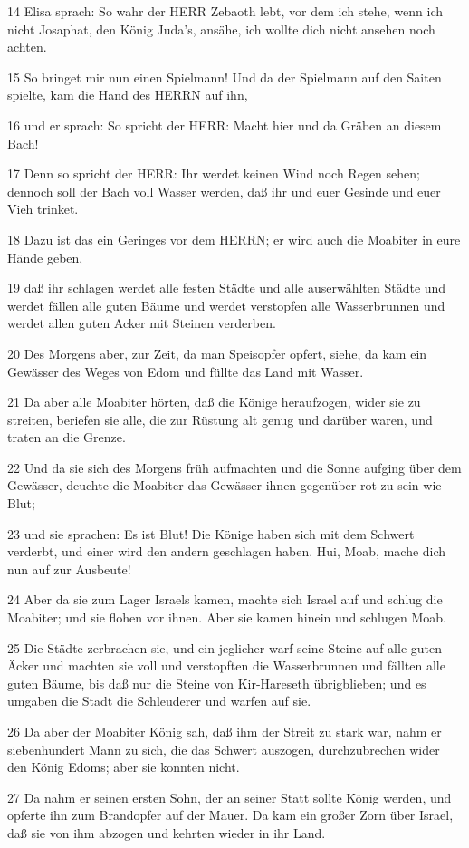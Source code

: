 \par 14 Elisa sprach: So wahr der HERR Zebaoth lebt, vor dem ich stehe, wenn ich nicht Josaphat, den König Juda's, ansähe, ich wollte dich nicht ansehen noch achten.
\par 15 So bringet mir nun einen Spielmann! Und da der Spielmann auf den Saiten spielte, kam die Hand des HERRN auf ihn,
\par 16 und er sprach: So spricht der HERR: Macht hier und da Gräben an diesem Bach!
\par 17 Denn so spricht der HERR: Ihr werdet keinen Wind noch Regen sehen; dennoch soll der Bach voll Wasser werden, daß ihr und euer Gesinde und euer Vieh trinket.
\par 18 Dazu ist das ein Geringes vor dem HERRN; er wird auch die Moabiter in eure Hände geben,
\par 19 daß ihr schlagen werdet alle festen Städte und alle auserwählten Städte und werdet fällen alle guten Bäume und werdet verstopfen alle Wasserbrunnen und werdet allen guten Acker mit Steinen verderben.
\par 20 Des Morgens aber, zur Zeit, da man Speisopfer opfert, siehe, da kam ein Gewässer des Weges von Edom und füllte das Land mit Wasser.
\par 21 Da aber alle Moabiter hörten, daß die Könige heraufzogen, wider sie zu streiten, beriefen sie alle, die zur Rüstung alt genug und darüber waren, und traten an die Grenze.
\par 22 Und da sie sich des Morgens früh aufmachten und die Sonne aufging über dem Gewässer, deuchte die Moabiter das Gewässer ihnen gegenüber rot zu sein wie Blut;
\par 23 und sie sprachen: Es ist Blut! Die Könige haben sich mit dem Schwert verderbt, und einer wird den andern geschlagen haben. Hui, Moab, mache dich nun auf zur Ausbeute!
\par 24 Aber da sie zum Lager Israels kamen, machte sich Israel auf und schlug die Moabiter; und sie flohen vor ihnen. Aber sie kamen hinein und schlugen Moab.
\par 25 Die Städte zerbrachen sie, und ein jeglicher warf seine Steine auf alle guten Äcker und machten sie voll und verstopften die Wasserbrunnen und fällten alle guten Bäume, bis daß nur die Steine von Kir-Hareseth übrigblieben; und es umgaben die Stadt die Schleuderer und warfen auf sie.
\par 26 Da aber der Moabiter König sah, daß ihm der Streit zu stark war, nahm er siebenhundert Mann zu sich, die das Schwert auszogen, durchzubrechen wider den König Edoms; aber sie konnten nicht.
\par 27 Da nahm er seinen ersten Sohn, der an seiner Statt sollte König werden, und opferte ihn zum Brandopfer auf der Mauer. Da kam ein großer Zorn über Israel, daß sie von ihm abzogen und kehrten wieder in ihr Land.

